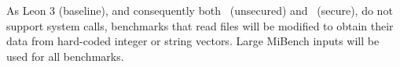   As Leon 3 (baseline), and consequently both \cshia~(unsecured) and \cshia~(secure), do not support system calls, benchmarks that read files will be modified to obtain their data from hard-coded integer or string vectors. Large MiBench inputs will be used for all benchmarks.

%   

